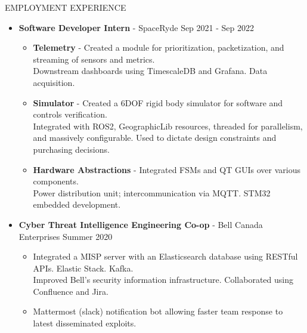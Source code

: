 \documentclass{resume} %
\begin{document}
\begin{rSection}{EMPLOYMENT EXPERIENCE}
    \begin{itemize}
        \item {\bf Software Developer Intern} - SpaceRyde \hfill {Sep 2021 - Sep 2022}
        \begin{itemize}[topsep=-10pt]
            \setlength\itemsep{-0.35em}
            \item[\textbullet] {\bf Telemetry} - Created a module for prioritization, packetization, and streaming of sensors and metrics.\\
            Downstream dashboards using TimescaleDB and Grafana. Data acquisition.
            \item[\textbullet] {\bf Simulator} - Created a 6DOF rigid body simulator for software and controls verification.\\
            Integrated with ROS2, GeographicLib resources, threaded for parallelism, and massively configurable.
            Used to dictate design constraints and purchasing decisions.
            \item[\textbullet] {\bf Hardware Abstractions} - Integrated FSMs and QT GUIs over various components.\\
            Power distribution unit; intercommunication via MQTT. STM32 embedded development.
        \end{itemize}
        \item {\bf Cyber Threat Intelligence Engineering Co-op} - Bell Canada Enterprises \hfill {Summer 2020}
        \begin{itemize}[topsep=-10pt]
            \setlength\itemsep{-0.35em}
            \item[\textbullet] Integrated a MISP server with an Elasticsearch database using RESTful APIs. Elastic Stack. Kafka.\\
            Improved Bell's security information infrastructure. Collaborated using Confluence and Jira.
            \item[\textbullet] Mattermost (slack) notification bot allowing faster team response to latest disseminated exploits.
        \end{itemize}
    \end{itemize}
\end{rSection}
\end{document}
